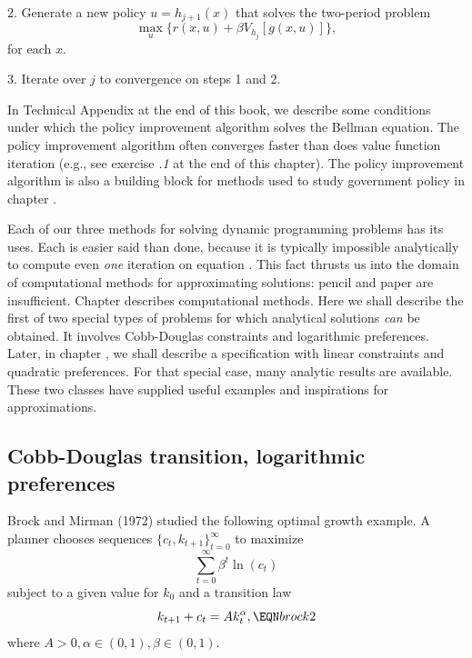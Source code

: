 \item{2.}  Generate a new policy $u=h_{j+1}(x)$ that solves the
two-period problem
$$ \max_u \{r(x,u) + \beta V_{h_j}[g(x,u)]\}  ,$$
for each $x$.
\vskip2cm  %
\item{3.}  Iterate over $j$ to convergence on steps 1 and 2.
\medskip

In  Technical Appendix  at the end of this book, 
 we describe some conditions under which the policy improvement algorithm
 solves the Bellman equation.  The policy improvement algorithm often
converges faster than does value function iteration (e.g., see
exercise {\it \the\chapternum.1\/} at the end of this chapter).
The policy improvement
algorithm is also a building block for methods used to study
government policy in chapter .


     Each of our three  methods for solving dynamic programming problems has its uses. Each is easier said than done,
      because it is typically impossible
analytically to compute even {\it one\/} iteration on equation .
This fact thrusts us into the domain of computational methods for
approximating solutions: pencil and paper are insufficient.
Chapter  describes  computational methods.
Here  we shall describe the first of two special
types of problems for which analytical solutions {\it can\/} be
obtained.  It involves
 Cobb-Douglas constraints and logarithmic preferences.
Later, in chapter , we shall describe a specification
with linear constraints and quadratic preferences.
For that special case, many analytic results are available.
These two classes have supplied useful 
examples and  inspirations for approximations.
\subsection{Cobb-Douglas transition, logarithmic preferences}
Brock and Mirman (1972) studied the  following optimal growth
example.
A planner chooses sequences $\{c_t,k_{t+1}\}_{t=0}^\infty$
to maximize
$$ \sum_{t=0}^\infty \beta^t \ln(c_t)$$
subject to a given value for $k_0$ and a transition law
$$ k_{t+1} + c_t = A k_t^\alpha ,\EQN brock2$$
where  $A >0, \alpha \in (0,1), \beta \in (0,1)$.


